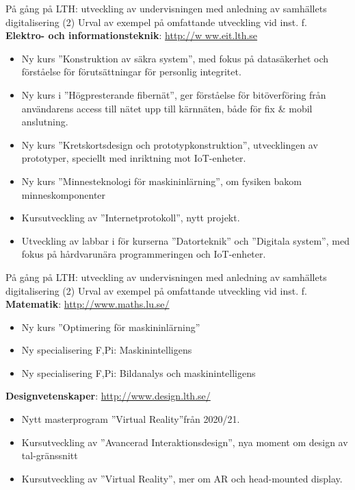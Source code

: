 \documentclass[aspectratio=169]{beamer}
\newenvironment{Slide}[1]%
  {\begin{frame}[environment=Slide]{#1}}
  {\end{frame}}%
\begin{document}
\begin{Slide}{På gång på LTH: utveckling av undervisningen med anledning av samhällets digitalisering (2)}
  Urval av exempel på omfattande utveckling vid inst. f. \\ \textbf{Elektro- och informationsteknik}: \url{http://w  ww.eit.lth.se} 
  \begin{itemize}\footnotesize
    \item Ny kurs ''Konstruktion av säkra system'', med fokus på datasäkerhet och förståelse för förutsättningar för personlig integritet.
    \item Ny kurs i ''Högpresterande fibernät'', ger förståelse för bitöverföring från användarens access till nätet upp till kärnnäten, både för fix \& mobil anslutning.
    \item Ny kurs ''Kretskortsdesign och prototypkonstruktion'', utvecklingen av prototyper, speciellt med inriktning mot IoT-enheter.
    \item Ny kurs ''Minnesteknologi för maskininlärning'', om fysiken bakom minneskomponenter 
    \item Kursutveckling av ''Internetprotokoll'', nytt projekt.
    \item Utveckling av labbar i för kurserna ''Datorteknik''  och ''Digitala system'', med fokus på hårdvarunära programmeringen och IoT-enheter. 
  \end{itemize}
\end{Slide}


\begin{Slide}{På gång på LTH: utveckling av undervisningen med anledning av samhällets digitalisering (2)}
  Urval av exempel på omfattande utveckling vid inst. f. \\ \textbf{Matematik}: \url{http://www.maths.lu.se/} 
  \begin{itemize}\footnotesize
    \item Ny kurs ''Optimering för maskininlärning''
    \item Ny specialisering F,Pi: Maskinintelligens 
    \item Ny specialisering F,Pi: Bildanalys och maskinintelligens 
  \end{itemize}
 \textbf{Designvetenskaper}: \url{http://www.design.lth.se/} 
  \begin{itemize}\footnotesize
    \item Nytt masterprogram ''Virtual Reality''från 2020/21.
    \item Kursutveckling av ''Avancerad Interaktionsdesign'', nya moment om design av tal-gränssnitt
    \item Kursutveckling av ''Virtual Reality'', mer om AR och head-mounted display.
  \end{itemize}
\end{Slide}
\end{document}
